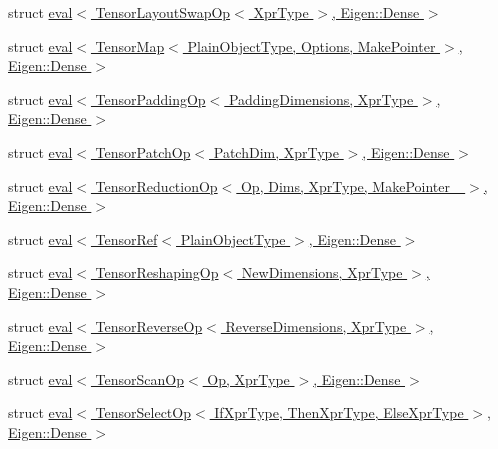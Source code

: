 \begin{DoxyCompactItemize}
\item 
struct \hyperlink{struct_eigen_1_1internal_1_1eval_3_01_tensor_layout_swap_op_3_01_xpr_type_01_4_00_01_eigen_1_1_dense_01_4}{eval$<$ Tensor\+Layout\+Swap\+Op$<$ Xpr\+Type $>$, Eigen\+::\+Dense $>$}
\item 
struct \hyperlink{struct_eigen_1_1internal_1_1eval_3_01_tensor_map_3_01_plain_object_type_00_01_options_00_01_make9cc59298b6a6c512619578e17b8db3ed}{eval$<$ Tensor\+Map$<$ Plain\+Object\+Type, Options, Make\+Pointer $>$, Eigen\+::\+Dense $>$}
\item 
struct \hyperlink{struct_eigen_1_1internal_1_1eval_3_01_tensor_padding_op_3_01_padding_dimensions_00_01_xpr_type_01_4_00_01_eigen_1_1_dense_01_4}{eval$<$ Tensor\+Padding\+Op$<$ Padding\+Dimensions, Xpr\+Type $>$, Eigen\+::\+Dense $>$}
\item 
struct \hyperlink{struct_eigen_1_1internal_1_1eval_3_01_tensor_patch_op_3_01_patch_dim_00_01_xpr_type_01_4_00_01_eigen_1_1_dense_01_4}{eval$<$ Tensor\+Patch\+Op$<$ Patch\+Dim, Xpr\+Type $>$, Eigen\+::\+Dense $>$}
\item 
struct \hyperlink{struct_eigen_1_1internal_1_1eval_3_01_tensor_reduction_op_3_01_op_00_01_dims_00_01_xpr_type_00_00c091111a76ab7a3f6cf062dd12dd3c4}{eval$<$ Tensor\+Reduction\+Op$<$ Op, Dims, Xpr\+Type, Make\+Pointer\+\_\+ $>$, Eigen\+::\+Dense $>$}
\item 
struct \hyperlink{struct_eigen_1_1internal_1_1eval_3_01_tensor_ref_3_01_plain_object_type_01_4_00_01_eigen_1_1_dense_01_4}{eval$<$ Tensor\+Ref$<$ Plain\+Object\+Type $>$, Eigen\+::\+Dense $>$}
\item 
struct \hyperlink{struct_eigen_1_1internal_1_1eval_3_01_tensor_reshaping_op_3_01_new_dimensions_00_01_xpr_type_01_4_00_01_eigen_1_1_dense_01_4}{eval$<$ Tensor\+Reshaping\+Op$<$ New\+Dimensions, Xpr\+Type $>$, Eigen\+::\+Dense $>$}
\item 
struct \hyperlink{struct_eigen_1_1internal_1_1eval_3_01_tensor_reverse_op_3_01_reverse_dimensions_00_01_xpr_type_01_4_00_01_eigen_1_1_dense_01_4}{eval$<$ Tensor\+Reverse\+Op$<$ Reverse\+Dimensions, Xpr\+Type $>$, Eigen\+::\+Dense $>$}
\item 
struct \hyperlink{struct_eigen_1_1internal_1_1eval_3_01_tensor_scan_op_3_01_op_00_01_xpr_type_01_4_00_01_eigen_1_1_dense_01_4}{eval$<$ Tensor\+Scan\+Op$<$ Op, Xpr\+Type $>$, Eigen\+::\+Dense $>$}
\item 
struct \hyperlink{struct_eigen_1_1internal_1_1eval_3_01_tensor_select_op_3_01_if_xpr_type_00_01_then_xpr_type_00_0a870a7ff2702168df3e9b7b8d1181076}{eval$<$ Tensor\+Select\+Op$<$ If\+Xpr\+Type, Then\+Xpr\+Type, Else\+Xpr\+Type $>$, Eigen\+::\+Dense $>$}

\end{DoxyCompactItemize}
